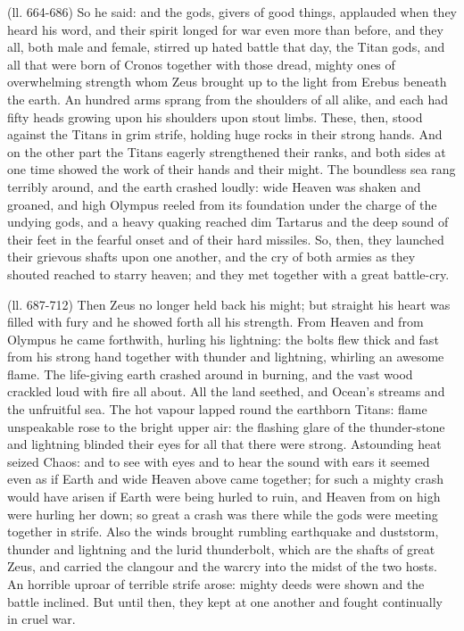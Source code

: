 (ll. 664-686) So he said: and the gods, givers of good things, applauded when
they heard his word, and their spirit longed for war even more than before, and
they all, both male and female, stirred up hated battle that day, the Titan
gods, and all that were born of Cronos together with those dread, mighty ones
of overwhelming strength whom Zeus brought up to the light from Erebus beneath
the earth. An hundred arms sprang from the shoulders of all alike, and each had
fifty heads growing upon his shoulders upon stout limbs. These, then, stood
against the Titans in grim strife, holding huge rocks in their strong hands.
And on the other part the Titans eagerly strengthened their ranks, and both
sides at one time showed the work of their hands and their might. The boundless
sea rang terribly around, and the earth crashed loudly: wide Heaven was shaken
and groaned, and high Olympus reeled from its foundation under the charge of
the undying gods, and a heavy quaking reached dim Tartarus and the deep sound
of their feet in the fearful onset and of their hard missiles. So, then, they
launched their grievous shafts upon one another, and the cry of both armies as
they shouted reached to starry heaven; and they met together with a great
battle-cry.

(ll. 687-712) Then Zeus no longer held back his might; but straight his heart
was filled with fury and he showed forth all his strength. From Heaven and from
Olympus he came forthwith, hurling his lightning: the bolts flew thick and fast
from his strong hand together with thunder and lightning, whirling an awesome
flame. The life-giving earth crashed around in burning, and the vast wood
crackled loud with fire all about. All the land seethed, and Ocean’s
streams and the unfruitful sea. The hot vapour lapped round the earthborn
Titans: flame unspeakable rose to the bright upper air: the flashing glare of
the thunder-stone and lightning blinded their eyes for all that there were
strong. Astounding heat seized Chaos: and to see with eyes and to hear the
sound with ears it seemed even as if Earth and wide Heaven above came together;
for such a mighty crash would have arisen if Earth were being hurled to ruin,
and Heaven from on high were hurling her down; so great a crash was there while
the gods were meeting together in strife. Also the winds brought rumbling
earthquake and duststorm, thunder and lightning and the lurid thunderbolt,
which are the shafts of great Zeus, and carried the clangour and the warcry
into the midst of the two hosts. An horrible uproar of terrible strife arose:
mighty deeds were shown and the battle inclined. But until then, they kept at
one another and fought continually in cruel war.

